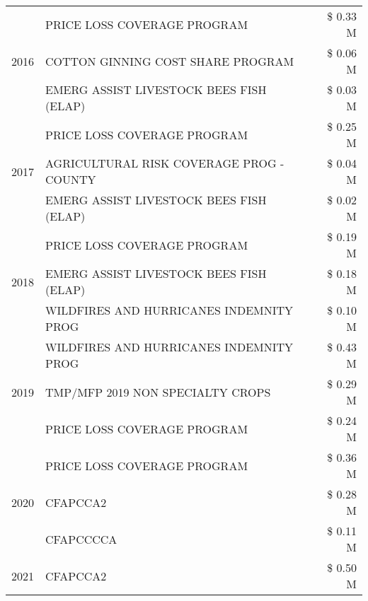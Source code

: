 \begin{tabular}{llr}
\cline{1-3}
\multirow[t]{3}{*}{2016} & PRICE LOSS COVERAGE PROGRAM                   & \$ 0.33 M \\
 & COTTON GINNING COST SHARE PROGRAM             & \$ 0.06 M \\
 & EMERG ASSIST LIVESTOCK BEES FISH (ELAP)       & \$ 0.03 M \\
\cline{1-3}
\multirow[t]{3}{*}{2017} & PRICE LOSS COVERAGE PROGRAM & \$ 0.25 M \\
 & AGRICULTURAL RISK COVERAGE PROG - COUNTY & \$ 0.04 M \\
 & EMERG ASSIST LIVESTOCK BEES FISH (ELAP) & \$ 0.02 M \\
\cline{1-3}
\multirow[t]{3}{*}{2018} & PRICE LOSS COVERAGE PROGRAM & \$ 0.19 M \\
 & EMERG ASSIST LIVESTOCK BEES FISH (ELAP) & \$ 0.18 M \\
 & WILDFIRES AND HURRICANES INDEMNITY PROG & \$ 0.10 M \\
\cline{1-3}
\multirow[t]{3}{*}{2019} & WILDFIRES AND HURRICANES INDEMNITY PROG & \$ 0.43 M \\
 & TMP/MFP 2019 NON SPECIALTY CROPS & \$ 0.29 M \\
 & PRICE LOSS COVERAGE PROGRAM & \$ 0.24 M \\
\cline{1-3}
\multirow[t]{3}{*}{2020} & PRICE LOSS COVERAGE PROGRAM & \$ 0.36 M \\
 & CFAPCCA2 & \$ 0.28 M \\
 & CFAPCCCCA & \$ 0.11 M \\
\cline{1-3}
2021 & CFAPCCA2 & \$ 0.50 M \\
\cline{1-3}
\bottomrule
\end{tabular}
